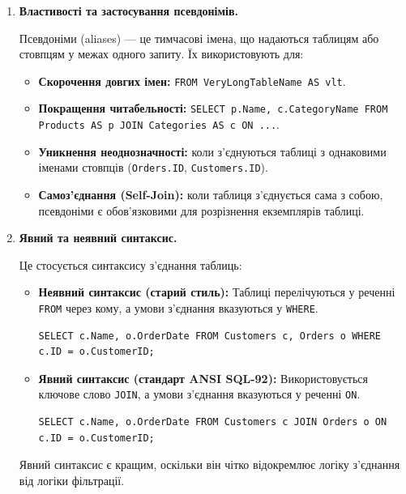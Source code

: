 \documentclass{article}
\begin{document}
\begin{enumerate}[label=\arabic*., leftmargin=*]
        \item \textbf{Властивості та застосування псевдонімів.}
        
        Псевдоніми (aliases) — це тимчасові імена, що надаються таблицям або стовпцям у межах одного запиту. Їх використовують для:
        \begin{itemize}
            \item \textbf{Скорочення довгих імен:} \texttt{FROM VeryLongTableName AS vlt}.
            \item \textbf{Покращення читабельності:} \texttt{SELECT p.Name, c.CategoryName FROM Products AS p JOIN Categories AS c ON ...}.
            \item \textbf{Уникнення неоднозначності:} коли з'єднуються таблиці з однаковими іменами стовпців (\texttt{Orders.ID}, \texttt{Customers.ID}).
            \item \textbf{Самоз'єднання (Self-Join):} коли таблиця з'єднується сама з собою, псевдоніми є обов'язковими для розрізнення екземплярів таблиці.
        \end{itemize}
        
        \item \textbf{Явний та неявний синтаксис.}
        
        Це стосується синтаксису з'єднання таблиць:
        \begin{itemize}
            \item \textbf{Неявний синтаксис (старий стиль):} Таблиці перелічуються у реченні \texttt{FROM} через кому, а умови з'єднання вказуються у \texttt{WHERE}.
            \begin{CodeBox}
            \begin{verbatim}
SELECT c.Name, o.OrderDate FROM Customers c, Orders o WHERE c.ID = o.CustomerID;
            \end{verbatim}
            \end{CodeBox}
            \item \textbf{Явний синтаксис (стандарт ANSI SQL-92):} Використовується ключове слово \texttt{JOIN}, а умови з'єднання вказуються у реченні \texttt{ON}.
            \begin{CodeBox}
            \begin{verbatim}
SELECT c.Name, o.OrderDate FROM Customers c JOIN Orders o ON c.ID = o.CustomerID;
            \end{verbatim}
            \end{CodeBox}
        \end{itemize}
        Явний синтаксис є кращим, оскільки він чітко відокремлює логіку з'єднання від логіки фільтрації.


\end{enumerate}
\end{document}
